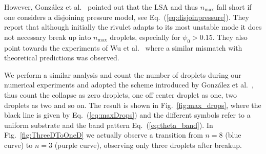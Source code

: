 \documentclass[twoside,twocolumn,9pt]{article}
\begin{document}
However, Gonz{\'a}lez et al.~\cite{gonzalezStabilityLiquidRing2013} pointed out that the LSA and thus $n_{\max}$ fall short if one considers a disjoining pressure model, see Eq.~(\ref{eq:disjoinpressure}).
They report that although initially the rivulet adapts to its most unstable mode it does not necessary break up into $n_{\max}$ droplets, especially for $\psi_0 > 0.15$. 
They also point towards the experiments of Wu et al.~\cite{wuCompetingLiquidPhase2011} where a similar mismatch with theoretical predictions was observed.

We perform a similar analysis and count the number of droplets during our numerical experiments and adopted the scheme introduced by Gonz{\'a}lez et al.~\cite{gonzalezStabilityLiquidRing2013}, thus count the collapse as zero droplets, one off center droplet as one, two droplets as two and so on.
The result is shown in Fig.~\ref{fig:max_drops}, where the black line is given by Eq.~(\ref{eq:maxDrops}) and the different symbols refer to a uniform substrate and the band pattern Eq.~(\ref{eq:theta_band}).
In Fig.~\ref{fig:ThreeDToOneD} we actually observe a transition from $n = 8$ (blue curve) to $n = 3$ (purple curve), observing only three droplets after breakup.
\end{document}
